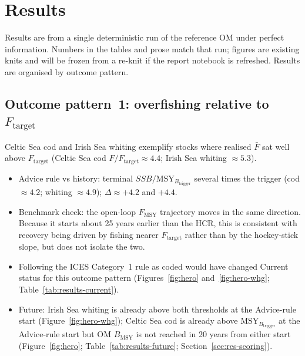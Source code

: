 \documentclass[11pt,a4paper]{article}
\newcommand{\Fmsy}{F_{\mathrm{MSY}}}
\newcommand{\Btrig}{\mathrm{MSY}_{B_{\mathrm{trigger}}}}
\newcommand{\Bmsy}{B_{\mathrm{MSY}}}
\newcommand{\Ftar}{F_{\mathrm{target}}}
\begin{document}
\section{Results}
\label{sec:results}

Results are from a single deterministic run of the reference OM under
perfect information. Numbers in the tables and prose match that run;
figures are existing knits and will be frozen from a re-knit if the
report notebook is refreshed. Results are organised by outcome pattern.

\subsection{Outcome pattern~1: overfishing relative to \texorpdfstring{$\Ftar$}{Ftarget}}
\label{sec:res-overfished}

Celtic Sea cod and Irish Sea whiting exemplify stocks where realised
$\bar F$ sat well above $\Ftar$ (Celtic Sea cod $F/\Ftar \approx 4.4$;
Irish Sea whiting $\approx 5.3$).
\begin{itemize}
  \item Advice rule vs history: terminal $SSB/\Btrig$ several times the
        trigger (cod $\approx 4.2$; whiting $\approx 4.9$);
        $\Delta \approx +4.2$ and $+4.4$.
  \item Benchmark check: the open-loop $\Fmsy$ trajectory moves in the
        same direction. Because it starts about 25 years earlier than
        the HCR, this is consistent with recovery being driven by fishing
        nearer $\Ftar$ rather than by the hockey-stick slope, but does
        not isolate the two.
  \item Following the ICES Category~1 rule as coded would have changed
        Current status for this outcome pattern
        (Figures~\ref{fig:hero} and~\ref{fig:hero-whg};
        Table~\ref{tab:results-current}).
  \item Future: Irish Sea whiting is already above both thresholds at the
        Advice-rule start (Figure~\ref{fig:hero-whg}); Celtic Sea cod is
        already above $\Btrig$ at the Advice-rule start but OM $\Bmsy$
        is not reached in 20 years from either start
        (Figure~\ref{fig:hero}; Table~\ref{tab:results-future};
        Section~\ref{sec:res-scoring}).
\end{itemize}
\end{document}
